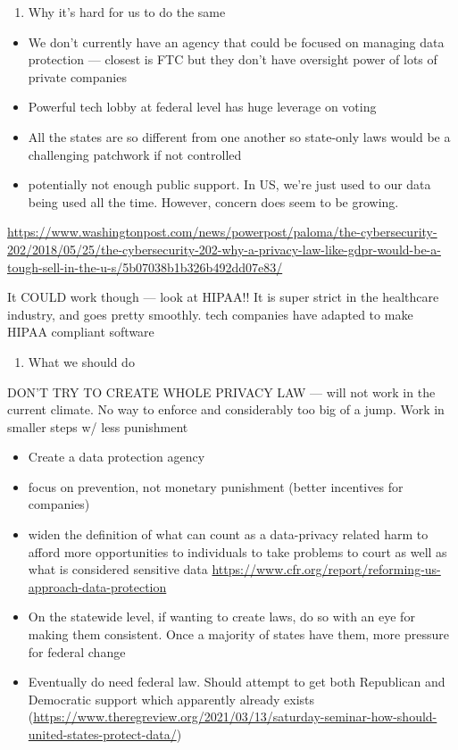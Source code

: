 \documentclass[water,article,submit,moreauthors,pdftex]{mdpi}
\providecommand{\tightlist}{%
  \setlength{\itemsep}{0pt}\setlength{\parskip}{4pt}}
\begin{document}
\begin{enumerate}
\def\labelenumi{\arabic{enumi}.}
\setcounter{enumi}{4}
\tightlist
\item
  Why it's hard for us to do the same
\end{enumerate}

\begin{itemize}
\tightlist
\item
  We don't currently have an agency that could be focused on managing
  data protection --- closest is FTC but they don't have oversight power
  of lots of private companies
\item
  Powerful tech lobby at federal level has huge leverage on voting
\item
  All the states are so different from one another so state-only laws
  would be a challenging patchwork if not controlled
\item
  potentially not enough public support. In US, we're just used to our
  data being used all the time. However, concern does seem to be
  growing.
\end{itemize}

\url{https://www.washingtonpost.com/news/powerpost/paloma/the-cybersecurity-202/2018/05/25/the-cybersecurity-202-why-a-privacy-law-like-gdpr-would-be-a-tough-sell-in-the-u-s/5b07038b1b326b492dd07e83/}

It COULD work though --- look at HIPAA!! It is super strict in the
healthcare industry, and goes pretty smoothly. tech companies have
adapted to make HIPAA compliant software

\begin{enumerate}
\def\labelenumi{\arabic{enumi}.}
\setcounter{enumi}{6}
\tightlist
\item
  What we should do
\end{enumerate}

DON'T TRY TO CREATE WHOLE PRIVACY LAW --- will not work in the current
climate. No way to enforce and considerably too big of a jump. Work in
smaller steps w/ less punishment

\begin{itemize}
\tightlist
\item
  Create a data protection agency
\item
  focus on prevention, not monetary punishment (better incentives for
  companies)
\item
  widen the definition of what can count as a data-privacy related harm
  to afford more opportunities to individuals to take problems to court
  as well as what is considered sensitive data
  \url{https://www.cfr.org/report/reforming-us-approach-data-protection}
\item
  On the statewide level, if wanting to create laws, do so with an eye
  for making them consistent. Once a majority of states have them, more
  pressure for federal change
\item
  Eventually do need federal law. Should attempt to get both Republican
  and Democratic support which apparently already exists
  (\url{https://www.theregreview.org/2021/03/13/saturday-seminar-how-should-united-states-protect-data/})
\end{itemize}
\end{document}
